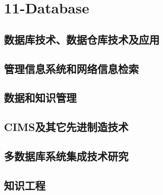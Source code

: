 

\chapter{11-Database}

\section{数据库技术、数据仓库技术及应用}
\section{管理信息系统和网络信息检索}
\section{数据和知识管理}
\section{CIMS及其它先进制造技术}
\section{多数据库系统集成技术研究}
\section{知识工程}







